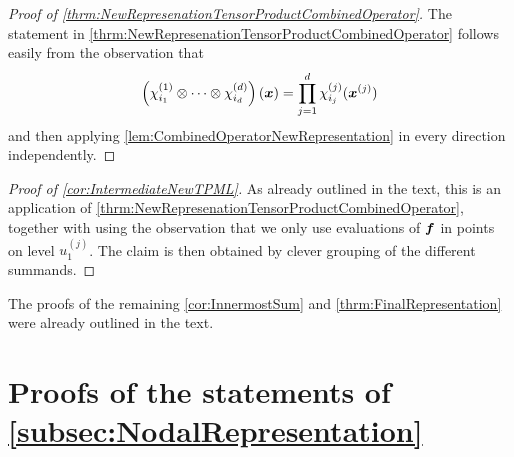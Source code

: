 \documentclass[	a4paper, 
								11pt]{article}
\theoremstyle{plain}
\begin{document}
\begin{proof}[Proof of \cref{thrm:NewRepresenationTensorProductCombinedOperator}]
The statement in \cref{thrm:NewRepresenationTensorProductCombinedOperator} follows easily from the observation that 
\begin{align*}
   \left( \chi^{(1)}_{i_1} \otimes \cdots \otimes \chi^{(d)}_{i_d} \right) (\boldsymbol{x}) = \prod_{j=1}^{d} \chi^{(j)}_{i_j} (\boldsymbol{x}^{(j)}) 
\end{align*}
 and then applying \cref{lem:CombinedOperatorNewRepresentation} in every direction independently.
\end{proof}

\begin{proof}[Proof of \cref{cor:IntermediateNewTPML}]
As already outlined in the text, this is an application of \cref{thrm:NewRepresenationTensorProductCombinedOperator}, together with using the observation that we only use evaluations of $ \boldsymbol{f} $ in points on level $ u_1^{(j)} $. The claim is then obtained by clever grouping of the different summands.
\end{proof}

The proofs of the remaining \cref{cor:InnermostSum} and \cref{thrm:FinalRepresentation} were already outlined in the text.


\section{Proofs of the statements of \cref{subsec:NodalRepresentation}}\label{app:Proofs2}
\end{document}
